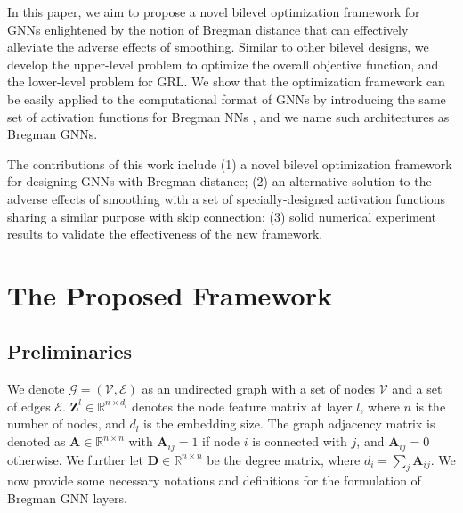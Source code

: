 \documentclass{article}
\begin{document}
In this paper, we aim to propose a novel bilevel optimization framework for GNNs enlightened by the notion of Bregman distance that can effectively alleviate the adverse effects of smoothing. Similar to other bilevel designs, we develop the upper-level problem to optimize the overall objective function, and the lower-level problem for GRL. We show that the optimization framework can be easily applied to the computational format of GNNs by introducing the same set of activation functions for Bregman NNs \cite{frecon2022bregman}, and we name such architectures as Bregman GNNs.

The contributions of this work include (1) a novel bilevel optimization framework for designing GNNs with Bregman distance; (2) an alternative solution to the adverse effects of smoothing with a set of specially-designed activation functions sharing a similar purpose with skip connection;  (3) solid numerical experiment results to validate the effectiveness of the new framework.


















\section{The Proposed Framework}\label{Sec:2}



\subsection{Preliminaries}\label{SubSec:2.1}
We denote  $\mathcal{G}=(\mathcal{V},\mathcal{E})$ as an undirected graph with a set of nodes $\mathcal{V}$ and a set of edges $\mathcal{E}$. $\mathbf Z^l \in \mathbb{R}^{n \times d_l}$ denotes the node feature matrix at layer $l$, where $n$ is the number of nodes, and $d_l$ is the embedding size. The graph adjacency matrix is denoted as $\mathbf A \in \mathbb{R}^{n \times n}$ with 
$\mathbf A_{ij}=1$ if node $i$ is connected with $j$, and $\mathbf A_{ij}=0$ otherwise.
We further let $\mathbf D\in \mathbb{R}^{n \times n}$ be the degree matrix, where $d_i = \sum_j \mathbf A_{ij}$. We now provide some necessary notations and definitions for the formulation of Bregman GNN layers.
\end{document}
